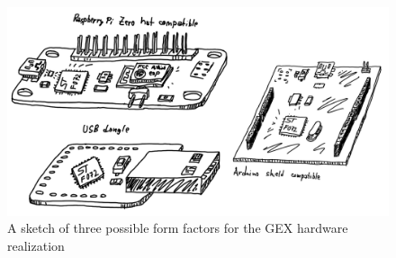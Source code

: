 \begin{figure}[h]
	\centering
	\includegraphics[width=\textwidth] {img/gex-ff-sketches.png}
	\caption[Form factor sketches]{\label{fig:ff_sketches}A sketch of three possible form factors for the GEX hardware realization}
\end{figure}









